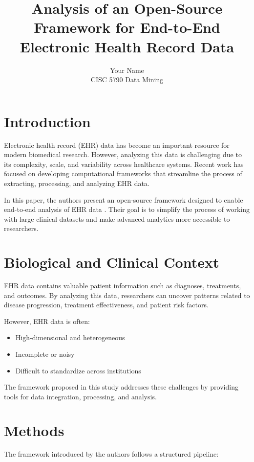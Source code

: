 \documentclass[12pt]{article}
\title{Analysis of an Open-Source Framework for End-to-End Electronic Health Record Data}
\author{Your Name \\ CISC 5790 Data Mining}
\date{}
\begin{document}
\maketitle

\onehalfspacing

\section{Introduction}

Electronic health record (EHR) data has become an important resource for modern biomedical research. 
However, analyzing this data is challenging due to its complexity, scale, and variability across healthcare systems. 
Recent work has focused on developing computational frameworks that streamline the process of extracting, processing, 
and analyzing EHR data.

In this paper, the authors present an open-source framework designed to enable end-to-end analysis of EHR data 
\cite{heumos2024open}. Their goal is to simplify the process of working with large clinical datasets and make 
advanced analytics more accessible to researchers.

\section{Biological and Clinical Context}

EHR data contains valuable patient information such as diagnoses, treatments, and outcomes. 
By analyzing this data, researchers can uncover patterns related to disease progression, treatment effectiveness, 
and patient risk factors.

However, EHR data is often:
\begin{itemize}
    \item High-dimensional and heterogeneous
    \item Incomplete or noisy
    \item Difficult to standardize across institutions
\end{itemize}

The framework proposed in this study addresses these challenges by providing tools for data integration, 
processing, and analysis.

\section{Methods}

The framework introduced by the authors follows a structured pipeline:
\end{document}
